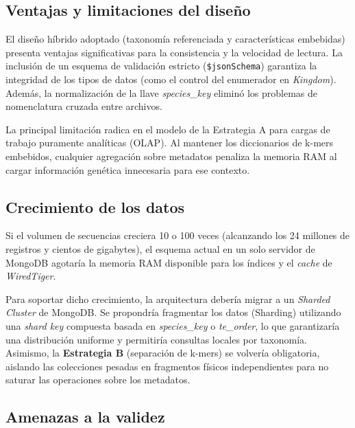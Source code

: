 \documentclass[pdflatex,lineno,referee,sn-vancouver-num]{sn-jnl}
\theoremstyle{thmstyleone}%
\theoremstyle{thmstyletwo}%
\theoremstyle{thmstylethree}%
\begin{document}
\subsection{Ventajas y limitaciones del diseño}\label{subsec:limitaciones}

El diseño híbrido adoptado (taxonomía referenciada y características embebidas) presenta ventajas significativas para la consistencia y la velocidad de lectura. La inclusión de un esquema de validación estricto (\texttt{\$jsonSchema}) garantiza la integridad de los tipos de datos (como el control del enumerador en \textit{Kingdom}). Además, la normalización de la llave \textit{species\_key} eliminó los problemas de nomenclatura cruzada entre archivos. 

La principal limitación radica en el modelo de la Estrategia A para cargas de trabajo puramente analíticas (OLAP). Al mantener los diccionarios de k-mers embebidos, cualquier agregación sobre metadatos penaliza la memoria RAM al cargar información genética innecesaria para ese contexto.

\subsection{Crecimiento de los datos}\label{subsec:crecimiento}

Si el volumen de secuencias creciera 10 o 100 veces (alcanzando los 24 millones de registros y cientos de gigabytes), el esquema actual en un solo servidor de MongoDB agotaría la memoria RAM disponible para los índices y el \textit{cache} de \textit{WiredTiger}. 

Para soportar dicho crecimiento, la arquitectura debería migrar a un \textit{Sharded Cluster} de MongoDB. Se propondría fragmentar los datos (Sharding) utilizando una \textit{shard key} compuesta basada en \textit{species\_key} o \textit{te\_order}, lo que garantizaría una distribución uniforme y permitiría consultas locales por taxonomía. Asimismo, la \textbf{Estrategia B} (separación de k-mers) se volvería obligatoria, aislando las colecciones pesadas en fragmentos físicos independientes para no saturar las operaciones sobre los metadatos.

\subsection{Amenazas a la validez}\label{subsec:validez}
\end{document}
